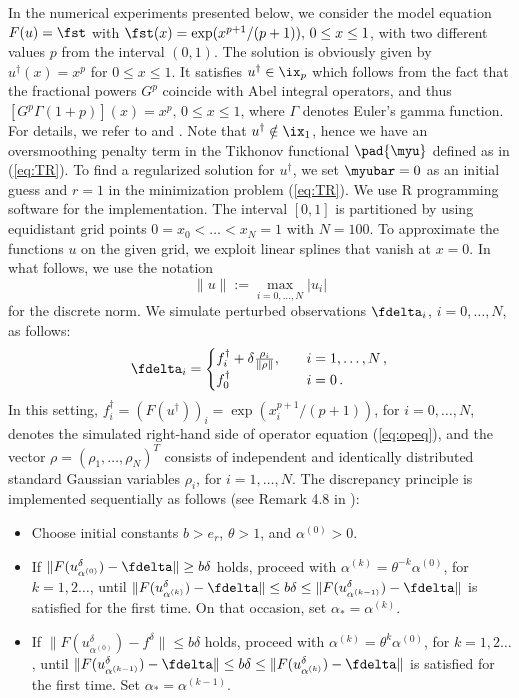 \documentclass[10pt]{article}
\theoremstyle{definition}
\begin{document}
In the numerical experiments presented below, we consider the model equation $ F(u) = \fst $ with $ \fst(x)=\exp(x^{p+1}/(p+1)), \, 0 \le x \le 1 $,
with two different values $p$ from the interval $(0,1)$.
The solution is obviously given by  $u^{\dagger}(x)=x^{p}$ for $ 0 \le x \le 1 $.
It satisfies $u^{\dagger}\in \ix_{p}$ which
follows from the fact that the fractional powers $ G^p $ coincide with
Abel integral operators, and thus $ [G^p \Gamma(1+p)](x) = x^p, \, 0 \le x \le 1 $,
where $ \Gamma $ denotes Euler's gamma function.
For details, we refer to
\cite[p.~9]{Gorenflo_Vessella91} and \cite{Plato97.2}.
Note that $u^{\dagger} \notin \ix_{1}$,
hence we have an oversmoothing penalty term in the Tikhonov functional $\pad{\myu}$ defined as in (\ref{eq:TR}).
%
To find a regularized solution for $u^{\dagger}$, we set $\myubar=0$ as an initial guess and $r=1$ in the minimization problem (\ref{eq:TR}).
%
We use R programming software \cite{RProg} for the implementation.
The interval $[0,1]$ is partitioned by using equidistant grid points $0=x_0<\ldots<x_N=1$ with $N=100$.
To approximate the functions $u$ on the given grid,
we exploit linear splines
that vanish at $ x = 0 $.
In what follows, we use the notation $$\lVert u\rVert:=\max_{i=0,\ldots,N}|u_{i}|$$ for the discrete norm.
We simulate perturbed observations $\fdelta_{i}$, $i=0,\ldots,N$, as follows:
\[
\fdelta_{i}=
\begin{cases}
f^{\dagger}_{i}+\delta\frac{\rho_{i}}{\lVert \rho \rVert}, \quad &i=1,\ldots,N\,, \\
f^{\dagger}_{0} \quad &i=0\,.
\end{cases}\]
In this setting, $f^{\dagger}_{i}=(F(u^{\dagger}))_{i}=\exp(x_{i}^{p+1}/(p+1))$, for $i=0,\ldots,N$,
denotes the simulated right-hand side of operator equation (\ref{eq:opeq}), and the vector $\rho=(\rho_{1},\ldots,\rho_{N})^{T}$ consists of independent and identically distributed standard Gaussian variables $\rho_{i}$, for $i=1,\ldots,N$.
The discrepancy principle is implemented sequentially as follows (see Remark 4.8 in \cite{HofPla20}):
\begin{itemize}
\item Choose initial constants $b>e_{r}$, $\theta>1$, and $\alpha^{(0)}>0$.
\item If $\lVert F(u_{\alpha^{(0)}}^{\delta})-{\fdelta}\rVert\geq b\delta$ holds, proceed with $\alpha^{(k)}=\theta^{-k}\alpha^{(0)}$, for $k=1,2\ldots$, until $\lVert F(u_{\alpha^{(k)}}^{\delta})-{\fdelta}\rVert\leq b\delta\leq \lVert F(u_{\alpha^{(k-1)}}^{\delta})-{\fdelta}\rVert$ is satisfied for the first time.
On that occasion, set $\alpha_{\ast}=\alpha^{(k)}$.
\item If $\lVert F(u_{\alpha^{(0)}}^{\delta})-f^{\delta}\rVert\leq b\delta$ holds, proceed with $\alpha^{(k)}=\theta^{k}\alpha^{(0)}$, for $k=1,2\ldots$, until $\lVert F(u_{\alpha^{(k-1)}}^{\delta})-\fdelta\rVert\leq b\delta\leq \lVert F(u_{\alpha^{(k)}}^{\delta})-{\fdelta}\rVert$ is satisfied for the first time.
Set $\alpha_{\ast}=\alpha^{(k-1)}$.
\end{itemize}
\end{document}
